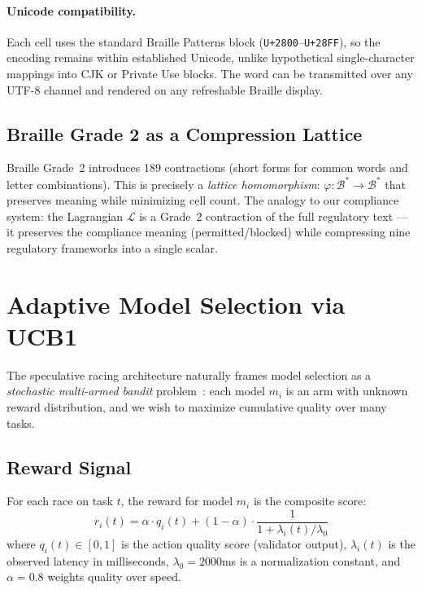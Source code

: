 \documentclass[11pt,twocolumn]{article}
\begin{document}
\paragraph{Unicode compatibility.}
Each cell uses the standard Braille Patterns block
(\texttt{U+2800}--\texttt{U+28FF}), so the encoding remains within
established Unicode, unlike hypothetical single-character mappings into
CJK or Private Use blocks. The word can be transmitted over any UTF-8
channel and rendered on any refreshable Braille display.

\subsection{Braille Grade 2 as a Compression Lattice}

Braille Grade~2 introduces 189 contractions (short forms for common words and
letter combinations). This is precisely a \emph{lattice homomorphism}:
$\varphi: \mathcal{B}^* \to \mathcal{B}^*$ that preserves meaning while
minimizing cell count. The analogy to our compliance system:
the Lagrangian $\mathcal{L}$ is a Grade~2 contraction of the full regulatory
text --- it preserves the compliance meaning (permitted/blocked) while compressing
nine regulatory frameworks into a single scalar.

\section{Adaptive Model Selection via UCB1}
\label{sec:bandit}

The speculative racing architecture naturally frames model selection as a
\emph{stochastic multi-armed bandit} problem~\cite{auer2002finite}: each model
$m_i$ is an arm with unknown reward distribution, and we wish to maximize
cumulative quality over many tasks.

\subsection{Reward Signal}

For each race on task $t$, the reward for model $m_i$ is the composite score:
\begin{equation}
  r_i(t) = \alpha \cdot q_i(t) + (1 - \alpha) \cdot \frac{1}{1 + \lambda_i(t) / \lambda_0}
\end{equation}
where $q_i(t) \in [0,1]$ is the action quality score (validator output),
$\lambda_i(t)$ is the observed latency in milliseconds, $\lambda_0 = 2000$ms
is a normalization constant, and $\alpha = 0.8$ weights quality over speed.
\end{document}
